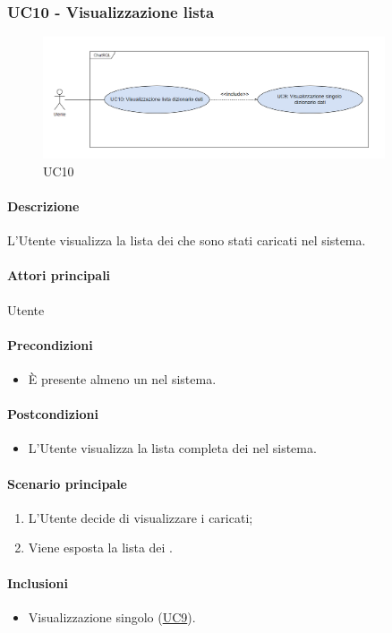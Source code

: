 \subsubsection{UC10 - Visualizzazione lista }\label{UC10}

\begin{figure}[H]
  \centering
  \includegraphics[width=0.90\textwidth]{assets/uc10.png}
  \caption{UC10}
\end{figure}

\paragraph*{Descrizione}
L’Utente visualizza la lista dei  che sono stati caricati nel sistema.

\paragraph*{Attori principali}
Utente

\paragraph*{Precondizioni}
\begin{itemize}
  \item È presente almeno un  nel sistema.  
\end{itemize}

\paragraph*{Postcondizioni}
\begin{itemize}
  \item L’Utente visualizza la lista completa dei  nel sistema.
\end{itemize}

\paragraph*{Scenario principale}
\begin{enumerate}
  \item L’Utente decide di visualizzare i  caricati;
  \item Viene esposta la lista dei .
\end{enumerate}

\paragraph*{Inclusioni}
\begin{itemize}
  \item Visualizzazione singolo  (\hyperref[UC9]{UC9}).
\end{itemize}

